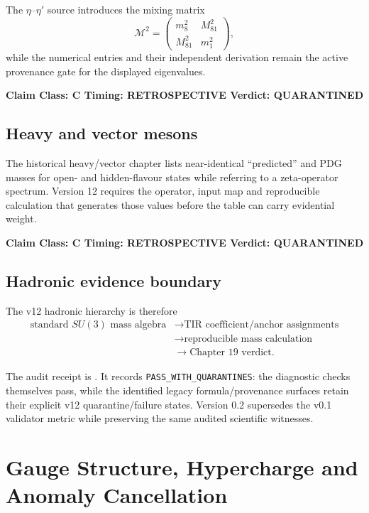 \documentclass[11pt,a4paper,twoside]{book}
\theoremstyle{definition}
\newcommand{\vTwelveStatus}[3]{\par\noindent\textbf{Claim Class: #1 \quad Timing: #2 \quad Verdict: #3}\par}
\begin{document}
The $\eta$--$\eta'$ source introduces the mixing matrix
\begin{equation}
\mathcal M^2=
\begin{pmatrix}
m_8^2&M_{81}^2\\
M_{81}^2&m_1^2
\end{pmatrix},
\end{equation}
while the numerical entries and their independent derivation remain the active provenance gate for the displayed eigenvalues.
\vTwelveStatus{C}{RETROSPECTIVE}{QUARANTINED}

\section{Heavy and vector mesons}

The historical heavy/vector chapter lists near-identical ``predicted'' and PDG masses for open- and hidden-flavour states while referring to a zeta-operator spectrum. Version 12 requires the operator, input map and reproducible calculation that generates those values before the table can carry evidential weight.
\vTwelveStatus{C}{RETROSPECTIVE}{QUARANTINED}

\section{Hadronic evidence boundary}

The v12 hadronic hierarchy is therefore
\[
\boxed{\begin{aligned}
\text{standard }SU(3)\text{ mass algebra}
&\to \text{TIR coefficient/anchor assignments}\\
&\to \text{reproducible mass calculation}\\
&\to \text{Chapter 19 verdict}.
\end{aligned}}
\]

The audit receipt is
. It records \texttt{PASS\_WITH\_QUARANTINES}: the diagnostic checks themselves pass, while the identified legacy formula/provenance surfaces retain their explicit v12 quarantine/failure states. Version 0.2 supersedes the v0.1 validator metric while preserving the same audited scientific witnesses.

\clearpage

\chapter[Gauge Structure and Anomalies]{Gauge Structure, Hypercharge and Anomaly Cancellation}
\label{ch:v12_gauge_hypercharge}
\end{document}
